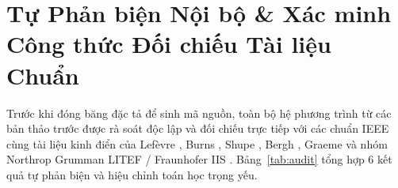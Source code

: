 \documentclass[11pt, a4paper]{article}
\begin{document}
\tableofcontents
\vspace{0.25cm}

\section{Tự Phản biện Nội bộ \& Xác minh Công thức Đối chiếu Tài liệu Chuẩn}

Trước khi đóng băng đặc tả để sinh mã nguồn, toàn bộ hệ phương trình từ các bản thảo trước được rà soát độc lập và đối chiếu trực tiếp với các chuẩn IEEE cùng tài liệu kinh điển của Lefèvre \cite{lefevre2022}, Burns \cite{burns1983}, Shupe \cite{shupe1980}, Bergh \cite{bergh1982}, Graeme \cite{graeme1996} và nhóm Northrop Grumman LITEF / Fraunhofer IIS \cite{waydhas2011, rieke2011}. Bảng~\ref{tab:audit} tổng hợp 6 kết quả tự phản biện và hiệu chỉnh toán học trọng yếu.
\end{document}
